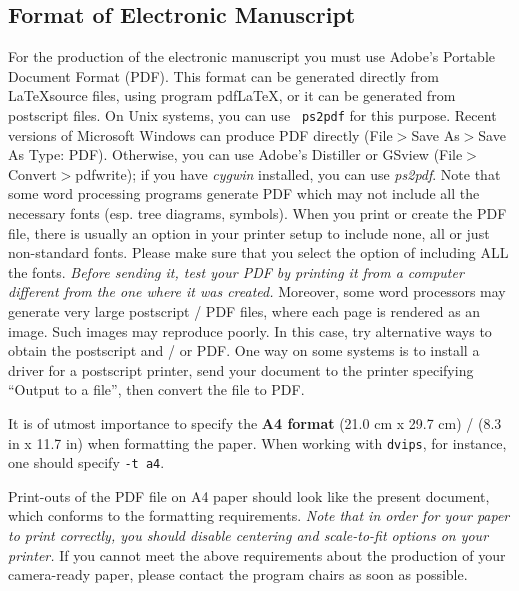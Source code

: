 \documentclass[]{article}
\begin{document}
\subsection{Format of Electronic Manuscript}
\label{sect:pdf}

For the production of the electronic manuscript you must use Adobe's
Portable Document Format (PDF). This format can be generated directly
from \LaTeX source files, using program pdf\LaTeX, or it can be
generated from postscript files. On Unix systems, you can use {\tt
  ps2pdf} for this purpose.  Recent versions of Microsoft Windows can
produce PDF directly (File$>$Save As$>$Save As Type: PDF). Otherwise,
you can use Adobe's Distiller or GSview (File$>$Convert$>$pdfwrite);
if you have \textit{cygwin} installed, you can use
\textit{ps2pdf}. Note that some word processing programs generate PDF
which may not include all the necessary fonts (esp. tree diagrams,
symbols). When you print or create the PDF file, there is usually an
option in your printer setup to include none, all or just non-standard
fonts.  Please make sure that you select the option of including ALL
the fonts. {\em Before sending it, test your PDF by printing it from a
  computer different from the one where it was created.} Moreover,
some word processors may generate very large postscript / PDF files,
where each page is rendered as an image. Such images may reproduce
poorly. In this case, try alternative ways to obtain the postscript
and / or PDF. One way on some systems is to install a driver for a
postscript printer, send your document to the printer specifying
``Output to a file'', then convert the file to PDF.


It is of utmost importance to specify the \textbf{A4 format} (21.0 cm
x 29.7 cm) / (8.3 in x 11.7 in) when formatting the paper. When working with
{\tt dvips}, for instance, one should specify {\tt -t a4}.

Print-outs of the PDF file on A4 paper should look like the
present document, which conforms to the formatting requirements. {\em
  Note that in order for your paper to print correctly, you should
  disable centering and scale-to-fit options on your printer.} If you
cannot meet the above requirements about the production of your
camera-ready paper, please contact the program chairs as soon as
possible.
\end{document}
